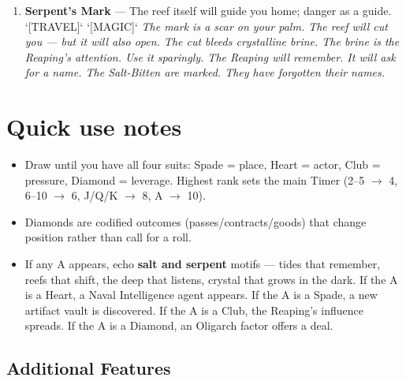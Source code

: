 \begin{enumerate}
  \hfill \textit{The coin is a finger bone. The official who takes it will not speak --- or not listen. The bone belonged to the Salt Prince's predecessor. He is still alive. He is in the coin. He is made of crystal. Patron Alaric has a box of them. He is selling them.}
\item[A] \textbf{Serpent's Mark} --- The reef itself will guide you home; danger as a guide. `[TRAVEL]` `[MAGIC]`
  \hfill \textit{The mark is a scar on your palm. The reef will cut you --- but it will also open. The cut bleeds crystalline brine. The brine is the Reaping's attention. Use it sparingly. The Reaping will remember. It will ask for a name. The Salt-Bitten are marked. They have forgotten their names.}
\end{enumerate}

\section*{Quick use notes}
\label{sec:zakov-quick-use}
\begin{itemize}
\item Draw until you have all four suits: Spade = place, Heart = actor, Club = pressure, Diamond = leverage. Highest rank sets the main Timer (2--5 $\rightarrow$ 4, 6--10 $\rightarrow$ 6, J/Q/K $\rightarrow$ 8, A $\rightarrow$ 10).
\item Diamonds are codified outcomes (passes/contracts/goods) that change position rather than call for a roll.
\item If any A appears, echo \textbf{salt and serpent} motifs --- tides that remember, reefs that shift, the deep that listens, crystal that grows in the dark. If the A is a Heart, a Naval Intelligence agent appears. If the A is a Spade, a new artifact vault is discovered. If the A is a Club, the Reaping's influence spreads. If the A is a Diamond, an Oligarch factor offers a deal.
\end{itemize}

\subsection*{Additional Features}
\label{sec:zakov-features}

